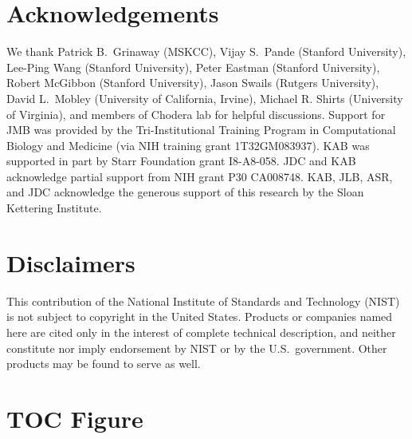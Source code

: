 \documentclass[aps,pre,twocolumn,nofootinbib,superscriptaddress,linenumbers]{revtex4-1}
\begin{document}

\section{Acknowledgements}

We thank Patrick B.~Grinaway (MSKCC), Vijay S.~Pande (Stanford University), Lee-Ping Wang (Stanford University), Peter Eastman (Stanford University), Robert McGibbon (Stanford University), Jason Swails (Rutgers University), David L.~Mobley (University of California, Irvine), Michael R. Shirts (University of Virginia), and members of Chodera lab for helpful discussions.  
Support for JMB was provided by the Tri-Institutional Training Program in Computational Biology and Medicine (via NIH training grant 1T32GM083937).  KAB was supported in part by Starr Foundation grant I8-A8-058.  JDC and KAB acknowledge partial support from NIH grant P30 CA008748.  KAB, JLB, ASR, and JDC acknowledge the generous support of this research by the Sloan Kettering Institute.


\section{Disclaimers}

This contribution of the National Institute of Standards and Technology (NIST) is not subject to copyright in the United States.  
Products or companies named here are cited only in the interest of complete technical description, and neither constitute nor imply endorsement by NIST or by the U.S.~government.  
Other products may be found to serve as well.

\clearpage

\section{TOC Figure}
\end{document}
